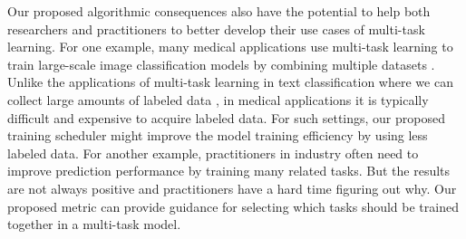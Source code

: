Our proposed algorithmic consequences also have the potential to help both researchers and practitioners to better develop their use cases of multi-task learning.
For one example, many medical applications use multi-task learning to train large-scale image classification models by combining multiple datasets \cite{chexnet17,EA20}.
Unlike the applications of multi-task learning in text classification where we can collect large amounts of labeled data \cite{GLUE}, in medical applications it is typically difficult and expensive to acquire labeled data.
For such settings, our proposed training scheduler might improve the model training efficiency by using less labeled data.
For another example, practitioners in industry often need to improve prediction performance by training many related tasks.
But the results are not always positive and practitioners have a hard time figuring out why.
Our proposed metric can provide guidance for selecting which tasks should be trained together in a multi-task model.
\fi







